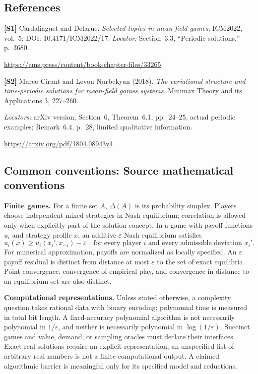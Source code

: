 \documentclass[11pt,a4paper]{article}
\begin{document}
\subsection*{References}
\begingroup\footnotesize\raggedright
{\footnotesize\raggedright
\textbf{[S1]} Cardaliaguet and Delarue. \emph{Selected topics in mean field games}, ICM2022, vol.~5; DOI: 10.4171/ICM2022/17. \textit{Locator:} Section~3.3, ``Periodic solutions,'' p.~3680.\par
\url{https://ems.press/content/book-chapter-files/33265}\par\smallskip
\textbf{[S2]} Marco Cirant and Levon Nurbekyan (2018). \emph{The variational structure and time-periodic solutions for mean-field games systems}. Minimax Theory and its Applications 3, 227--260.\par
\textit{Locators:} arXiv version, Section~6, Theorem~6.1, pp.~24--25, actual periodic examples; Remark~6.4, p.~28, limited qualitative information.\par
\url{https://arxiv.org/pdf/1804.08943v1}\par}
\par\endgroup

\subsection*{Common conventions: Source mathematical conventions}

\textbf{Finite games.} For a finite set $A$, $\Delta(A)$ is its probability
simplex. Players choose independent mixed strategies in Nash equilibrium;
correlation is allowed only when explicitly part of the solution concept.
In a game with payoff functions $u_i$ and strategy profile $x$, an additive
$\varepsilon$ Nash equilibrium satisfies
\[
 u_i(x)\geq u_i(x_i',x_{-i})-\varepsilon
 \quad\text{for every player $i$ and every admissible deviation $x_i'$}.
\]
For numerical approximation, payoffs are normalized as locally specified.
An $\varepsilon$ payoff residual is distinct from distance at most
$\varepsilon$ to the set of exact equilibria. Point convergence, convergence
of empirical play, and convergence in distance to an equilibrium set are
also distinct.

\textbf{Computational representations.} Unless stated otherwise, a complexity
question takes rational data with binary encoding; polynomial time is measured
in total bit length. A fixed-accuracy polynomial algorithm is not necessarily
polynomial in $1/\varepsilon$, and neither is necessarily polynomial in
$\log(1/\varepsilon)$. Succinct games and value, demand, or sampling oracles
must declare their interfaces. Exact real solutions require an explicit
representation; an unspecified list of arbitrary real numbers is not a
finite computational output. A claimed algorithmic barrier is meaningful
only for its specified model and reductions.
\end{document}
